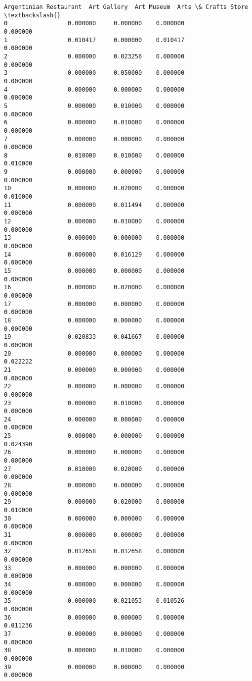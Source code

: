 \documentclass[11pt]{article}
\begin{document}
\begin{tcolorbox}[breakable, size=fbox, boxrule=.5pt, pad at break*=1mm, opacityfill=0]
\begin{Verbatim}[commandchars=\\\{\}]
    Argentinian Restaurant  Art Gallery  Art Museum  Arts \& Crafts Store  \textbackslash{}
0                 0.000000     0.000000    0.000000             0.000000
1                 0.010417     0.000000    0.010417             0.000000
2                 0.000000     0.023256    0.000000             0.000000
3                 0.000000     0.050000    0.000000             0.000000
4                 0.000000     0.000000    0.000000             0.000000
5                 0.000000     0.010000    0.000000             0.000000
6                 0.000000     0.010000    0.000000             0.000000
7                 0.000000     0.000000    0.000000             0.000000
8                 0.010000     0.010000    0.000000             0.010000
9                 0.000000     0.000000    0.000000             0.000000
10                0.000000     0.020000    0.000000             0.010000
11                0.000000     0.011494    0.000000             0.000000
12                0.000000     0.010000    0.000000             0.000000
13                0.000000     0.000000    0.000000             0.000000
14                0.000000     0.016129    0.000000             0.000000
15                0.000000     0.000000    0.000000             0.000000
16                0.000000     0.020000    0.000000             0.000000
17                0.000000     0.000000    0.000000             0.000000
18                0.000000     0.000000    0.000000             0.000000
19                0.020833     0.041667    0.000000             0.000000
20                0.000000     0.000000    0.000000             0.022222
21                0.000000     0.000000    0.000000             0.000000
22                0.000000     0.000000    0.000000             0.000000
23                0.000000     0.010000    0.000000             0.000000
24                0.000000     0.000000    0.000000             0.000000
25                0.000000     0.000000    0.000000             0.024390
26                0.000000     0.000000    0.000000             0.000000
27                0.010000     0.020000    0.000000             0.000000
28                0.000000     0.000000    0.000000             0.000000
29                0.000000     0.020000    0.000000             0.010000
30                0.000000     0.000000    0.000000             0.000000
31                0.000000     0.000000    0.000000             0.000000
32                0.012658     0.012658    0.000000             0.000000
33                0.000000     0.000000    0.000000             0.000000
34                0.000000     0.000000    0.000000             0.000000
35                0.000000     0.021053    0.010526             0.000000
36                0.000000     0.000000    0.000000             0.011236
37                0.000000     0.000000    0.000000             0.000000
38                0.000000     0.010000    0.000000             0.000000
39                0.000000     0.000000    0.000000             0.000000


\end{Verbatim}
\end{tcolorbox}
\end{document}
